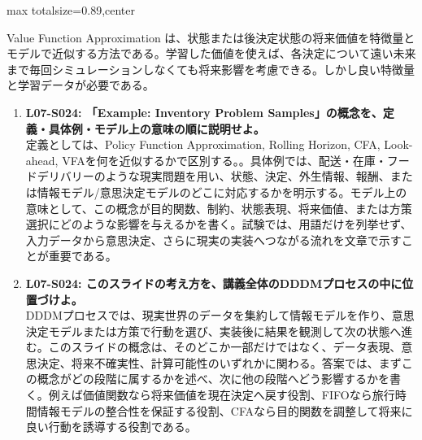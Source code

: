 \begin{minipage}[t]{0.58\textwidth}
\begin{adjustbox}{max totalsize={\textwidth}{0.89\textheight},center}
\begin{minipage}{\textwidth}
Value Function Approximation は、状態または後決定状態の将来価値を特徴量とモデルで近似する方法である。学習した価値を使えば、各決定について遠い未来まで毎回シミュレーションしなくても将来影響を考慮できる。しかし良い特徴量と学習データが必要である。\par{}\begin{enumerate}\item \textbf{L07-S024: 「Example: Inventory Problem Samples」の概念を、定義・具体例・モデル上の意味の順に説明せよ。}\\定義としては、Policy Function Approximation, Rolling Horizon, CFA, Look-ahead, VFAを何を近似するかで区別する。。具体例では、配送・在庫・フードデリバリーのような現実問題を用い、状態、決定、外生情報、報酬、または情報モデル/意思決定モデルのどこに対応するかを明示する。モデル上の意味として、この概念が目的関数、制約、状態表現、将来価値、または方策選択にどのような影響を与えるかを書く。試験では、用語だけを列挙せず、入力データから意思決定、さらに現実の実装へつながる流れを文章で示すことが重要である。\item \textbf{L07-S024: このスライドの考え方を、講義全体のDDDMプロセスの中に位置づけよ。}\\DDDMプロセスでは、現実世界のデータを集約して情報モデルを作り、意思決定モデルまたは方策で行動を選び、実装後に結果を観測して次の状態へ進む。このスライドの概念は、そのどこか一部だけではなく、データ表現、意思決定、将来不確実性、計算可能性のいずれかに関わる。答案では、まずこの概念がどの段階に属するかを述べ、次に他の段階へどう影響するかを書く。例えば価値関数なら将来価値を現在決定へ戻す役割、FIFOなら旅行時間情報モデルの整合性を保証する役割、CFAなら目的関数を調整して将来に良い行動を誘導する役割である。\end{enumerate}
\end{minipage}
\end{adjustbox}
\end{minipage}


